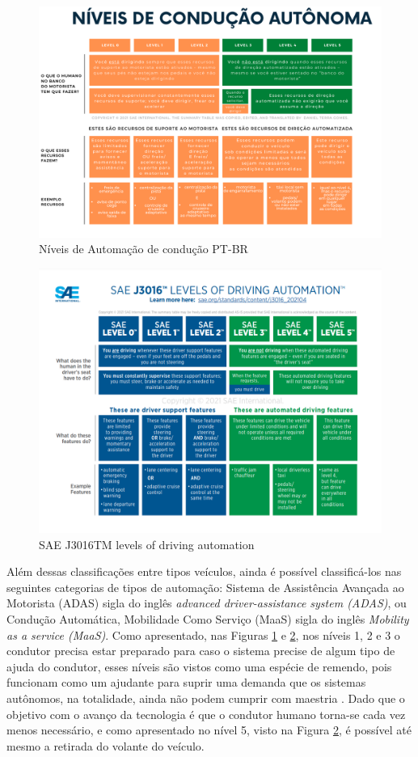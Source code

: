 \begin{figure}[H]
\centering
\includegraphics[width=15cm]{Figures/IC-Graph1.png}
\caption{Níveis de Automação de condução PT-BR}
\label{Graph_PT}
\end{figure}
\begin{figure}[H]
\centering
\includegraphics[width=15cm]{Figures/IC-GrapEN.png}
\caption{SAE J3016TM levels of driving automation \cite{SAE}}
\label{Graph_EN}
\end{figure}

Além dessas classificações entre tipos veículos, ainda é possível classificá-los nas seguintes categorias de tipos de automação: Sistema de Assistência Avançada ao Motorista (ADAS) sigla do inglês \textit{advanced driver-assistance system (ADAS)}, ou Condução Automática, Mobilidade Como Serviço (MaaS) sigla do inglês \textit{Mobility as a service (MaaS)}.
Como apresentado, nas Figuras \ref{Graph_PT} e \ref{Graph_EN}, nos níveis 1, 2 e 3 o condutor precisa estar preparado para caso o sistema precise de algum tipo de ajuda do condutor, esses níveis são vistos como uma espécie de remendo, pois funcionam como um ajudante para suprir uma demanda que os sistemas autônomos, na totalidade, ainda não podem cumprir com maestria \cite{4cenarios_ocidental}. Dado que o objetivo com o avanço da tecnologia é que o condutor humano torna-se cada vez menos necessário, e como apresentado no nível 5, visto na Figura \ref{Graph_EN}, é possível até mesmo a retirada do volante do veículo. 

